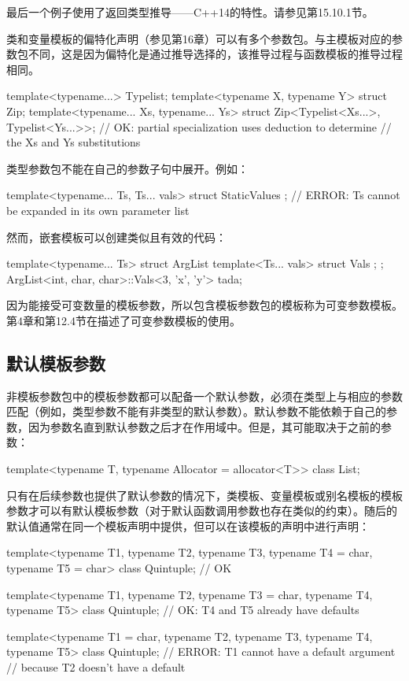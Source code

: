 最后一个例子使用了返回类型推导——C++14的特性。请参见第15.10.1节。

类和变量模板的偏特化声明（参见第16章）可以有多个参数包。与主模板对应的参数包不同，这是因为偏特化是通过推导选择的，该推导过程与函数模板的推导过程相同。

\begin{cpp}
template<typename...> Typelist;
template<typename X, typename Y> struct Zip;
template<typename... Xs, typename... Ys>
	struct Zip<Typelist<Xs...>, Typelist<Ys...>>;
	// OK: partial specialization uses deduction to determine
	// the Xs and Ys substitutions
\end{cpp}

类型参数包不能在自己的参数子句中展开。例如：

\begin{cpp}
template<typename... Ts, Ts... vals> struct StaticValues {};
// ERROR: Ts cannot be expanded in its own parameter list
\end{cpp}

然而，嵌套模板可以创建类似且有效的代码：

\begin{cpp}
template<typename... Ts> struct ArgList {
	template<Ts... vals> struct Vals {};
};
ArgList<int, char, char>::Vals<3, 'x', 'y'> tada;
\end{cpp}

因为能接受可变数量的模板参数，所以包含模板参数包的模板称为可变参数模板。第4章和第12.4节在描述了可变参数模板的使用。

\subsection{默认模板参数}

非模板参数包中的模板参数都可以配备一个默认参数，必须在类型上与相应的参数匹配（例如，类型参数不能有非类型的默认参数）。默认参数不能依赖于自己的参数，因为参数名直到默认参数之后才在作用域中。但是，其可能取决于之前的参数：

\begin{cpp}
template<typename T, typename Allocator = allocator<T>>
class List;
\end{cpp}

只有在后续参数也提供了默认参数的情况下，类模板、变量模板或别名模板的模板参数才可以有默认模板参数（对于默认函数调用参数也存在类似的约束）。随后的默认值通常在同一个模板声明中提供，但可以在该模板的声明中进行声明：

\begin{cpp}
template<typename T1, typename T2, typename T3,
typename T4 = char, typename T5 = char>
class Quintuple; // OK

template<typename T1, typename T2, typename T3 = char,
typename T4, typename T5>
class Quintuple; // OK: T4 and T5 already have defaults

template<typename T1 = char, typename T2, typename T3,
typename T4, typename T5>
class Quintuple; // ERROR: T1 cannot have a default argument
// because T2 doesn't have a default
\end{cpp}

